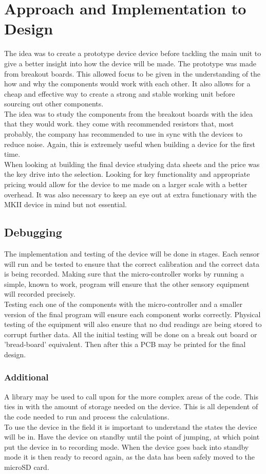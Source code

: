 \documentclass{report}
\begin{document}
\section{Approach and Implementation to Design}
The idea was to create a prototype device device before tackling the main unit to give a better insight into how the device will be made. The prototype was made from breakout boards. This allowed focus to be given in the understanding of the how and why the components would work with each other. It also allows for a cheap and effective way to create a strong and stable working unit before sourcing out other components. \\
The idea was to study the components from the breakout boards with the idea that they would work. they come with recommended resistors that, most probably, the company has recommended to use in sync with the devices to reduce noise. Again, this is extremely useful when building a device for the first time.\\
When looking at building the final device studying data sheets and the price was the key drive into the selection. Looking for key functionality and appropriate pricing would allow for the device to me made on a larger scale with a better overhead. It was also necessary to keep an eye out at extra functionary with the MKII device in mind but not essential.
  
\subsection{Debugging}
The implementation and testing of the device will be done in stages. Each sensor will run and be tested to ensure that the correct calibration and the correct data is being recorded. Making sure that the micro-controller works by running a simple, known to work, program will ensure that the other sensory equipment will recorded precisely. \\
Testing each one of the components with the micro-controller and a smaller version of the final program will ensure each component works correctly. Physical testing of the equipment will also ensure that no dud readings are being stored to corrupt further data. 
All the initial testing will be done on a break out board or 'bread-board' equivalent. Then after this a PCB may be printed for the final design.\\

\subsubsection{Additional}
A library  may be used to call upon for the more complex areas of the code. This ties in with the amount of storage needed on the device. This is all dependent of the code needed to run and process the calculations. \\
To use the device in the field it is important to understand the states the device will be in. Have the device on standby until the point of jumping, at which point put the device in to recording mode. When the device goes back into standby mode it is then ready to record again, as the data has been safely moved to the microSD card. 
  
\end{document}
